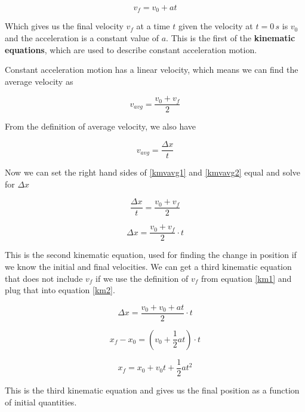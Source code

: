 \documentclass[12pt]{book}
\begin{document}
\begin{equation}
v_f = v_0 + at
\label{km1}
\end{equation}

Which gives us the final velocity $v_f$ at a time $t$ given the velocity at $t = 0 \, s$ is $v_0$ and the acceleration is a constant value of $a$. This is the first of the \textbf{kinematic equations}, which are used to describe constant acceleration motion.

Constant acceleration motion has a linear velocity, which means we can find the average velocity as 

\begin{equation}
v_{avg} = \frac{v_0 + v_f}{2}
\label{kmvavg1}
\end{equation}

From the definition of average velocity, we also have 

\begin{equation}
v_{avg} = \frac{\Delta x}{t}
\label{kmvavg2}
\end{equation}


Now we can set the right hand sides of \ref{kmvavg1} and \ref{kmvavg2} equal and solve for $\Delta x$

\begin{equation}
\frac{\Delta x}{t} = \frac{v_0 + v_f}{2}
\end{equation}

\begin{equation}
\Delta x = \frac{v_0 + v_f}{2} \cdot t
\label{km2}
\end{equation}

This is the second kinematic equation, used for finding the change in position if we know the initial and final velocities. We can get a third kinematic equation that does not include $v_f$ if we use the definition of $v_f$ from equation \ref{km1} and plug that into equation \ref{km2}.

\begin{equation}
\Delta x = \frac{v_0 + v_0 + at}{2} \cdot t
\end{equation}

\begin{equation}
x_f - x_0 =  (v_0 + \frac{1}{2}at) \cdot t
\end{equation}

\begin{equation}
x_f = x_0 + v_0 t + \frac{1}{2} a t^2
\label{km3}
\end{equation}

This is the third kinematic equation and gives us the final position as a function of initial quantities.
\end{document}
